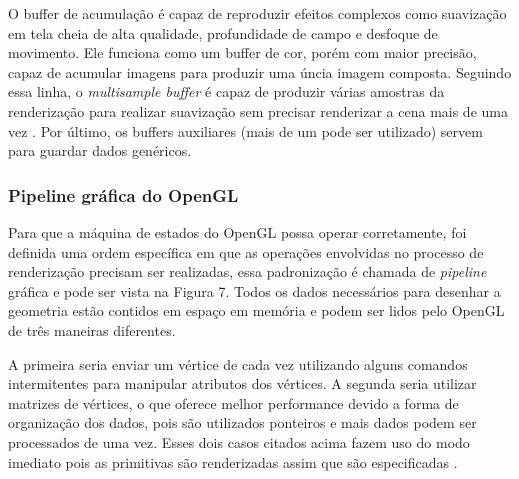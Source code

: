     \begin{figure}[h!]
		\centering
	\end{figure}
	\nocite{stcbuf}

O buffer de acumulação é capaz de reproduzir efeitos complexos como suavização em tela cheia de alta qualidade, profundidade de campo e desfoque de movimento. Ele funciona como um buffer de cor, porém com maior precisão, capaz de acumular imagens para produzir uma úncia imagem composta. Seguindo essa linha, o \textit{multisample buffer} é capaz de produzir várias amostras da renderização para realizar suavização sem precisar renderizar a cena mais de uma vez \cite{GLSLBook}. Por último, os buffers auxiliares (mais de um pode ser utilizado) servem para guardar dados genéricos.

\subsubsection{Pipeline gráfica do OpenGL}
\label{sec:pipeline-opengl}

Para que a máquina de estados do OpenGL possa operar corretamente, foi definida uma ordem específica em que as operações envolvidas no processo de renderização precisam ser realizadas, essa padronização é chamada de \textit{pipeline} gráfica \cite{GLSLBook} e pode ser vista na Figura 7. Todos os dados necessários para desenhar a geometria estão contidos em espaço em memória e podem ser lidos pelo OpenGL de três maneiras diferentes. 

A primeira seria enviar um vértice de cada vez utilizando alguns comandos intermitentes para manipular atributos dos vértices. A segunda seria utilizar matrizes de vértices, o que oferece melhor performance devido a forma de organização dos dados, pois são utilizados ponteiros e mais dados podem ser processados de uma vez. Esses dois casos citados acima fazem uso do modo imediato pois as primitivas são renderizadas assim que são especificadas \cite{GLSLBook}. 

